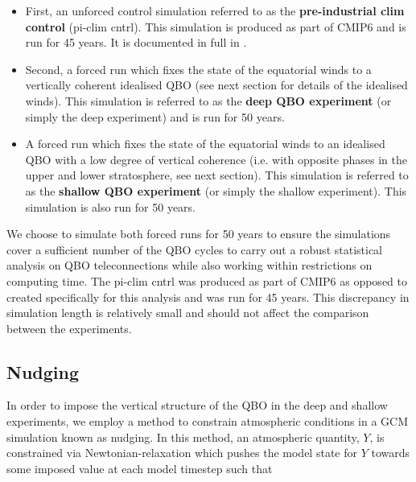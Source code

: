 \begin{itemize}
    \item First, an unforced control simulation referred to as the \textbf{pre-industrial clim control} (pi-clim cntrl). This simulation is produced as part of CMIP6 and is run for 45 years. It is documented in full in \cite{oconnorAssessment2021b}. 
    
    \item Second, a forced run which fixes the state of the equatorial winds to a vertically coherent idealised QBO (see next section for details of the idealised winds). This simulation is referred to as the \textbf{deep QBO experiment} (or simply the deep experiment) and is run for 50 years.
    
    \item A forced run which fixes the state of the equatorial winds to an idealised QBO with a low degree of vertical coherence (i.e. with opposite phases in the upper and lower stratosphere, see next section). This simulation is referred to as the \textbf{shallow QBO experiment} (or simply the shallow experiment). This simulation is also run for 50 years.
    
\end{itemize}

We choose to simulate both forced runs for 50 years to ensure the simulations cover a sufficient number of the QBO cycles to carry out a robust statistical analysis on QBO teleconnections while also working within restrictions on computing time. The pi-clim cntrl was produced as part of CMIP6 as opposed to created specifically for this analysis and was run for 45 years. This discrepancy in simulation length is relatively small and should not affect the comparison between the experiments. 



\subsection{Nudging}
In order to impose the vertical structure of the QBO in the deep and shallow experiments, we employ a method to constrain atmospheric conditions in a GCM simulation known as nudging. In this method, an atmospheric quantity, $Y$, is constrained via Newtonian-relaxation which pushes the model state for $Y$ towards some imposed value at each model timestep such that

